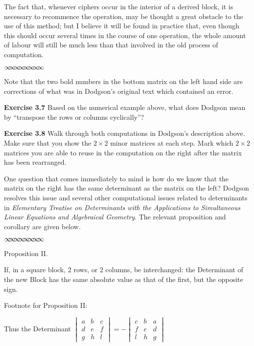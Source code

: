 \documentclass[11pt]{article}%
\theoremstyle{definition}
\newcommand{\sep}{\vspace{-3pt} \begin{center}
{\mathversion{normal}
$\infty \mspace{-5.5mu} \infty \mspace{-5.5mu}
\infty \mspace{-5.5mu} \infty \mspace{-5.5mu}
\infty \mspace{-5.5mu} \infty \mspace{-5.5mu}
\infty \mspace{-5.5mu} \infty$}
\end{center} \vspace{-3pt}}
\begin{document}
\textsf{The fact that, whenever ciphers occur in the interior of a derived
block, it is necessary to recommence the operation, may be thought a great
obstacle to the use of this method; but I believe it will be found in practice
that, even though this should occur several times in the course of one
operation, the whole amount of labour will still be much less than that
involved in the old process of computation.}%

\sep


\bigskip

Note that the two bold numbers in the bottom matrix on the left hand side are
corrections of what was in Dodgson's original text which contained an error.

\bigskip

\noindent\textbf{Exercise 3.7} Based on the numerical example above, what does
Dodgson mean by \textquotedblleft transpose the rows or columns
cyclically\textquotedblright?

\bigskip

\noindent\textbf{Exercise 3.8} Walk through both computations in Dodgson's
description above. Make sure that you show the $2\times2$ minor matrices at
each step. Mark which $2\times2$ matrices you are able to reuse in the
computation on the right after the matrix has been rearranged.

\bigskip

One question that comes immediately to mind is how do we know that the matrix
on the right has the same determinant as the matrix on the left? Dodgson
resolves this issue and several other computational issues related to
determinants in \textit{Elementary Treatise on Determinants with the
Applications to Simultaneous Linear Equations and Algebraical Geometry}. The
relevant proposition and corollary are given below.%

\sep


\begin{center}
\textsf{Proposition II.}
\end{center}

\textsf{If, in a square block, 2 rows, or 2 columns, be interchanged: the
Determinant of the new Block has the same absolute value as that of the first,
but the opposite sign.}

\bigskip\textsf{Footnote for Proposition II:}

\textsf{Thus the Determinant }$%
\begin{vmatrix}
a & b & c\\
d & e & f\\
g & h & l
\end{vmatrix}
=-%
\begin{vmatrix}
c & b & a\\
f & e & d\\
l & h & g
\end{vmatrix}
$
\end{document}
